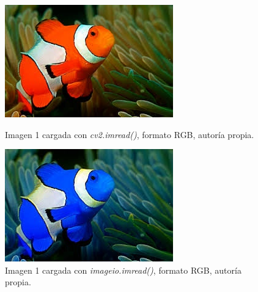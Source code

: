 \documentclass[a4paper,12pt]{article}
\begin{document}
{\begin{figure}[H]
  \centering
  \begin{minipage}[t]{0.45\textwidth}
      \centering
      \includegraphics[width=\textwidth]{processed_data/cv2_charged_0.jpg} 
      \caption{Imagen 1 cargada con \textit{cv2.imread()}, formato RGB, autoría propia.}
      \label{fig:cv2_charged}
  \end{minipage}
  \hfill
  \begin{minipage}[t]{0.45\textwidth}
      \centering
      \includegraphics[width=\textwidth]{processed_data/imageio_charged_0.jpg}
      \caption{Imagen 1 cargada con \textit{imageio.imread()}, formato RGB, autoría propia.}
      \label{fig:imageio_charged}
  \end{minipage}
\end{figure}

\vspace{0.5cm}

}
\end{document}
